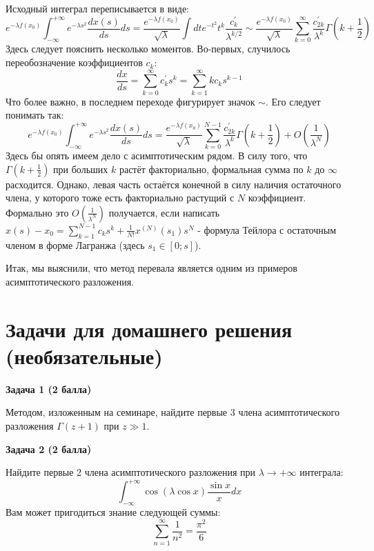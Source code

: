 \documentclass[a4paper,12pt]{article}
\begin{document}
\noindent
Исходный интеграл переписывается в виде:
$$
e^{-\lambda f(x_0)}\int_{-\infty}^{+\infty}e^{-\lambda s^2}\frac{dx(s)}{ds}ds=\frac{e^{-\lambda f(x_0)}}{\sqrt{\lambda}}\int dt e^{-t^2}t^k \frac{c^{'}_k}{\lambda^{k/2}}\sim\frac{e^{-\lambda f(x_0)}}{\sqrt{\lambda}}\sum_{k=0}^{\infty}\frac{c_{2k}^{'}}{\lambda^{k}}\Gamma\left(k+\frac{1}{2}\right)
$$
Здесь следует пояснить несколько моментов. Во-первых, случилось переобозначение коэффициентов $c_k$:
$$
\frac{dx}{ds}=\sum_{k=0}^{\infty}c_k^{'}s^k=\sum_{k=1}^{\infty}kc_{k}s^{k-1}
$$
Что более важно, в последнем переходе фигурирует значок $\sim$. Его следует понимать так:
$$
e^{-\lambda f(x_0)}\int_{-\infty}^{+\infty}e^{-\lambda s^2}\frac{dx(s)}{ds}ds=\frac{e^{-\lambda f(x_0)}}{\sqrt{\lambda}}\sum_{k=0}^{N-1}\frac{c_{2k}^{'}}{\lambda^{k}}\Gamma\left(k+\frac{1}{2}\right)+O\left(\frac{1}{\lambda^{N}}\right)
$$
Здесь бы опять имеем дело с асимптотическим рядом. В силу того, что $\Gamma\left(k+\frac{1}{2}\right)$ при больших $k$ растёт факториально, формальная сумма по $k$ до $\infty$ расходится. Однако, левая часть остаётся конечной в силу наличия остаточного члена, у которого тоже есть факториально растущий с $N$ коэффициент. Формально это $O\left(\frac{1}{\lambda^{N}}\right)$ получается, если написать $x(s)-x_0=\sum_{k=1}^{N-1}c_k s^k+\frac{1}{N!}x^{(N)}(s_1)s^{N}$ - формула Тейлора с остаточным членом в форме Лагранжа (здесь $s_1\in[0;s]$).

\noindent
Итак, мы выяснили, что метод перевала является одним из примеров асимптотического разложения.
\section*{Задачи для домашнего решения (необязательные)}

\noindent \textbf {Задача 1 (2 балла)} 

\noindent Методом, изложенным на семинаре, найдите первые 3 члена асимптотического разложения $\Gamma(z+1)$ при $z\gg1$.

\noindent \textbf {Задача 2 (2 балла)}

\noindent Найдите первые 2 члена асимптотического разложения при $\lambda\to+\infty$ интеграла:
$$
\int_{-\infty}^{+\infty}\cos\left(\lambda\cos x\right)\frac{\sin x}{x}dx
$$ 
Вам может пригодиться знание следующей суммы:
$$
\sum_{n=1}^{\infty}\frac{1}{n^2}=\frac{\pi^2}{6}
$$
\end{document}
